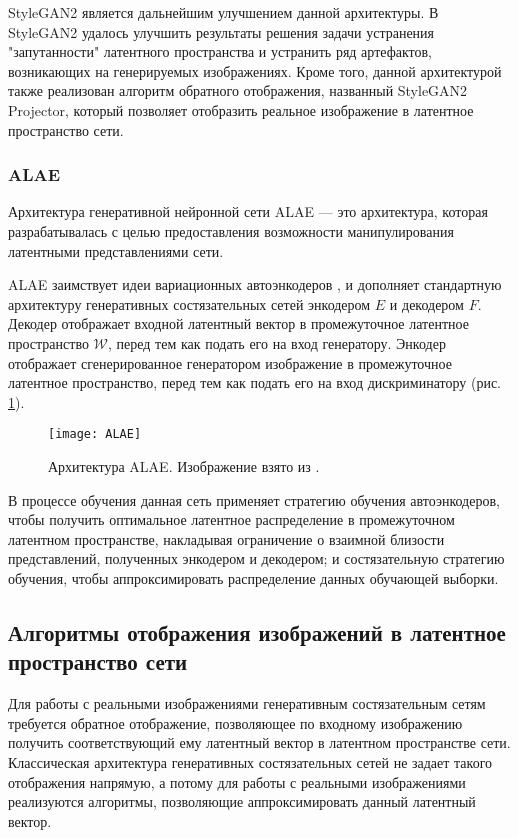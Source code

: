 StyleGAN2 \cite{karras2020stylegan2} является дальнейшим улучшением данной архитектуры.
В StyleGAN2 удалось улучшить результаты решения задачи устранения "запутанности" латентного пространства и устранить ряд артефактов, возникающих на генерируемых изображениях.
Кроме того, данной архитектурой также реализован алгоритм обратного отображения, названный StyleGAN2 Projector, который позволяет отобразить реальное изображение в латентное пространство сети.

\subsubsection{ALAE}
Архитектура генеративной нейронной сети ALAE \cite{ALAE} –-- это архитектура, которая разрабатывалась с целью предоставления возможности манипулирования латентными представлениями сети.

ALAE заимствует идеи вариационных автоэнкодеров \cite{kingma2014vae}, и дополняет стандартную архитектуру генеративных состязательных сетей энкодером $E$ и декодером $F$.
Декодер отображает входной латентный вектор в промежуточное латентное пространство $\mathcal W$, перед тем как подать его на вход генератору.
Энкодер отображает сгенерированное генератором изображение в промежуточное латентное пространство, перед тем как подать его на вход дискриминатору (рис. \ref{fig:alae}).

\begin{figure}[h]
\begin{center}
    \texttt{[image: ALAE]}
    \caption{Архитектура ALAE. Изображение взято из \cite{ALAE}.}
    \label{fig:alae}
\end{center}
\end{figure}

В процессе обучения данная сеть применяет стратегию обучения автоэнкодеров, чтобы получить оптимальное латентное распределение в промежуточном латентном пространстве, накладывая ограничение о взаимной близости представлений, полученных энкодером и декодером;
и состязательную стратегию обучения, чтобы аппроксимировать распределение данных обучающей выборки.


\subsection{Алгоритмы отображения изображений в латентное пространство сети}

Для работы с реальными изображениями генеративным состязательным сетям требуется обратное отображение, позволяющее по входному изображению получить соответствующий ему латентный вектор в латентном пространстве сети. 
Классическая архитектура генеративных состязательных сетей не задает такого отображения напрямую, а потому для работы с реальными изображениями реализуются алгоритмы, позволяющие аппроксимировать данный латентный вектор.

